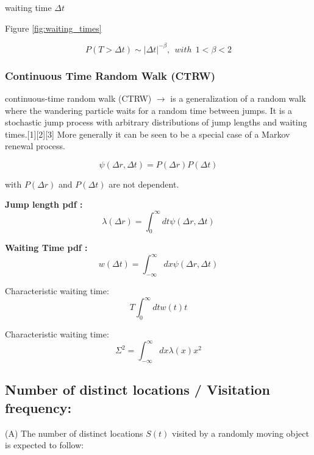 waiting time $\Delta t$


Figure \ref{fig:waiting_times}

\begin{equation}
P(T > \Delta t) \sim |\Delta t|^{-\beta}, ~~ with~~  1< \beta < 2
\end{equation}



\subsubsection{Continuous Time Random Walk (CTRW)}

continuous-time random walk (CTRW)  $\rightarrow$ is a generalization of a random walk where the wandering particle waits for a random time between jumps. It is a stochastic jump process with arbitrary distributions of jump lengths and waiting times.[1][2][3] More generally it can be seen to be a special case of a Markov renewal process.

\begin{equation}
\psi(\Delta r,\Delta t)=P(\Delta r)P(\Delta t)
\end{equation}

with $P(\Delta r)$ and $P(\Delta t)$ are not dependent.

{\bf Jump length pdf :}
\begin{equation}
\lambda(\Delta r) = \int_0^{\infty} dt \psi(\Delta r,\Delta t)
\end{equation}

{\bf Waiting Time pdf :}
\begin{equation}
w(\Delta t) = \int_{-\infty}^{\infty} dx \psi(\Delta r,\Delta t)
\end{equation}

Characteristic waiting time:
\begin{equation}
T \int_0^{\infty} dt w(t)t
\end{equation}


Characteristic waiting time:
\begin{equation}
\Sigma^2 = \int_{-\infty}^{\infty} dx \lambda(x) x^2
\end{equation}


\subsection{Number of distinct locations / Visitation frequency:}

(A) The number of distinct locations $S(t)$ visited by a randomly
moving object is expected to follow:


